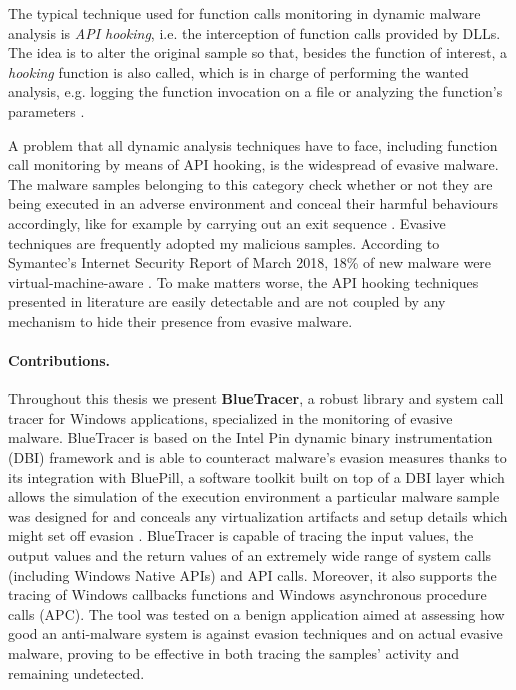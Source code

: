 The typical technique used for function calls monitoring in dynamic malware analysis is \textit{API hooking}, i.e. the interception of function calls provided by DLLs. The idea is to alter the original sample so that, besides the function of interest, a \textit{hooking} function is also called, which is in charge of performing the wanted analysis, e.g. logging the function invocation on a file or analyzing the function's parameters \cite{Egele:2008:SAD:2089125.2089126}.      

A problem that all dynamic analysis techniques have to face, including function call monitoring by means of API hooking, is the widespread of evasive malware. The malware samples belonging to this category check whether or not they are being executed in an adverse environment and conceal their harmful behaviours accordingly, like for example by carrying out an exit sequence \cite{BluePill}. Evasive techniques are frequently adopted my malicious samples. According to Symantec's Internet Security Report of March 2018, 18\% of new malware were virtual-machine-aware \cite{Symantec}. To make matters worse, the API hooking techniques presented in literature are easily detectable and are not coupled by any mechanism to hide their presence from evasive malware.

\paragraph{Contributions.}
Throughout this thesis we present \textbf{BlueTracer}, a robust library and system call tracer for Windows applications, specialized in the monitoring of evasive malware. BlueTracer is based on the Intel Pin \cite{Pin} dynamic binary instrumentation (DBI) framework and is able to counteract malware's evasion measures thanks to its integration with BluePill, a software toolkit built on top of a DBI layer which allows the simulation of the execution environment a particular malware sample was designed for and conceals any virtualization artifacts and setup details which might set off evasion \cite{BluePill}. BlueTracer is capable of tracing the input values, the output values and the return values of an extremely wide range of system calls (including Windows Native APIs) and API calls. Moreover, it also supports the tracing of Windows callbacks functions and Windows asynchronous procedure calls (APC). The tool was tested on a benign application aimed at assessing how good an anti-malware system is against evasion techniques and on actual evasive malware, proving to be effective in both tracing the samples' activity and remaining undetected.                

